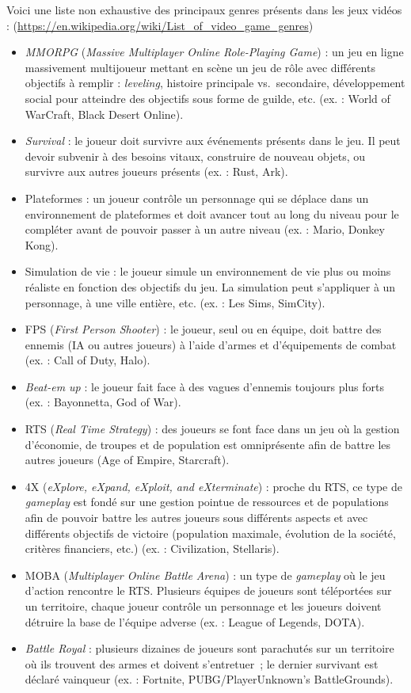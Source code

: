 Voici une liste non exhaustive des principaux genres présents dans les jeux vidéos : (\url{https://en.wikipedia.org/wiki/List_of_video_game_genres})
\begin{itemize}
\label{MMORPG}
    \item \emph{MMORPG} (\emph{Massive Multiplayer Online Role-Playing Game}) : un jeu en ligne massivement multijoueur mettant en scène un jeu de rôle avec différents objectifs à remplir : \emph{leveling}, histoire principale vs.\ secondaire, développement social pour atteindre des objectifs sous forme de guilde, etc. (ex. : World of WarCraft, Black Desert Online).
    \item \emph{Survival} : le joueur doit survivre aux événements présents dans le jeu. Il peut devoir subvenir à des besoins vitaux, construire de nouveau objets, ou survivre aux autres joueurs présents (ex. : Rust, Ark).
    \item Plateformes : un joueur contrôle un personnage qui se déplace dans un environnement de plateformes et doit avancer tout au long du niveau pour le compl\'eter avant de pouvoir passer à un autre niveau (ex. : Mario, Donkey Kong).
    \item Simulation de vie : le joueur simule un environnement de vie plus ou moins réaliste en fonction des objectifs du jeu. La simulation peut s'appliquer à un personnage, à une ville entière, etc. (ex. : Les Sims, SimCity).
    \item FPS (\emph{First Person Shooter}) : le joueur, seul ou en équipe, doit battre des ennemis (IA ou autres joueurs) à l'aide d'armes et d'équipements de combat (ex. : Call of Duty, Halo).
    \item \emph{Beat-em up} : le joueur fait face à des vagues d'ennemis toujours plus forts (ex. : Bayonnetta, God of War).
    \item RTS (\emph{Real Time Strategy}) : des joueurs se font face dans un jeu o\`u la gestion d'économie, de troupes et de population est omniprésente afin de battre les autres joueurs (Age of Empire, Starcraft).
    \item 4X (\emph{eXplore, eXpand, eXploit, and eXterminate}) : proche du RTS, ce type de \emph{gameplay} est fondé sur une gestion pointue de ressources et de populations afin de pouvoir battre les autres joueurs sous différents aspects et avec différents objectifs de victoire (population maximale, évolution de la société, critères financiers, etc.) (ex. : Civilization, Stellaris).
    \item MOBA (\emph{Multiplayer Online Battle Arena}) : un type de \emph{gameplay} o\`u le jeu d'action rencontre le RTS. Plusieurs équipes de joueurs sont téléportées sur un territoire, chaque joueur contrôle un personnage et les joueurs doivent détruire la base de l'équipe adverse (ex. : League of Legends, DOTA).
    \item \emph{Battle Royal} : plusieurs dizaines de joueurs sont parachutés sur un territoire o\`u ils trouvent des armes et doivent s'entretuer~; le dernier survivant est déclaré vainqueur (ex. : Fortnite, PUBG/PlayerUnknown's BattleGrounds).
\end{itemize}

